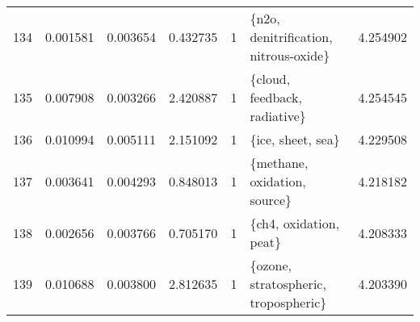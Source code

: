 \begin{tabular}{lrrrrlr}
134 &    0.001581 &  0.003654 &        0.432735 &           1 &   \{n2o, denitrification, nitrous-oxide\} &  4.254902 \\
135 &    0.007908 &  0.003266 &        2.420887 &           1 &            \{cloud, feedback, radiative\} &  4.254545 \\
136 &    0.010994 &  0.005111 &        2.151092 &           1 &                       \{ice, sheet, sea\} &  4.229508 \\
137 &    0.003641 &  0.004293 &        0.848013 &           1 &            \{methane, oxidation, source\} &  4.218182 \\
138 &    0.002656 &  0.003766 &        0.705170 &           1 &                  \{ch4, oxidation, peat\} &  4.208333 \\
139 &    0.010688 &  0.003800 &        2.812635 &           1 &    \{ozone, stratospheric, tropospheric\} &  4.203390 \\
\bottomrule
\end{tabular}
